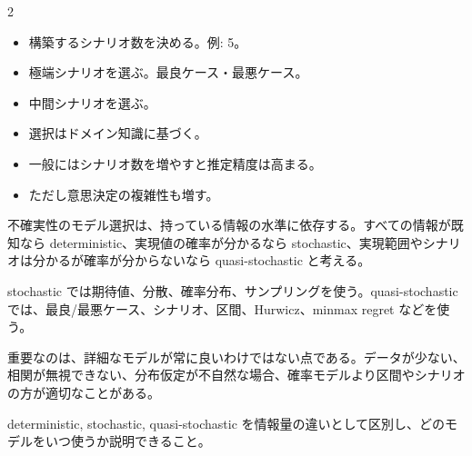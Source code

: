 \clearpage



\vspace{1.5mm}

\begin{multicols}{2}

\footnotesize

\raggedcolumns


\begin{itemize}
\item 構築するシナリオ数を決める。例: 5。
\item 極端シナリオを選ぶ。最良ケース・最悪ケース。
\item 中間シナリオを選ぶ。
\item 選択はドメイン知識に基づく。
\item 一般にはシナリオ数を増やすと推定精度は高まる。
\item ただし意思決定の複雑性も増す。
\end{itemize}

不確実性のモデル選択は、持っている情報の水準に依存する。すべての情報が既知なら deterministic、実現値の確率が分かるなら stochastic、実現範囲やシナリオは分かるが確率が分からないなら quasi-stochastic と考える。\par

stochastic では期待値、分散、確率分布、サンプリングを使う。quasi-stochastic では、最良/最悪ケース、シナリオ、区間、Hurwicz、minmax regret などを使う。\par

重要なのは、詳細なモデルが常に良いわけではない点である。データが少ない、相関が無視できない、分布仮定が不自然な場合、確率モデルより区間やシナリオの方が適切なことがある。\par

deterministic, stochastic, quasi-stochastic を情報量の違いとして区別し、どのモデルをいつ使うか説明できること。\par


\end{multicols}
